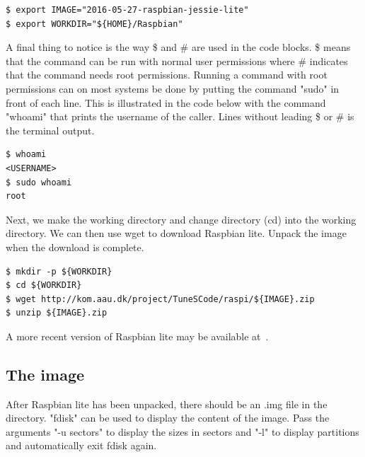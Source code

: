 
\begin{lstlisting}[]
$ export IMAGE="2016-05-27-raspbian-jessie-lite"
$ export WORKDIR="${HOME}/Raspbian"
\end{lstlisting}
\FloatBarrier
\vspace{-5mm}

A final thing to notice is the way \$ and \# are used in the code blocks. \$
means that the command can be run with normal user permissions where \# indicates that the
command needs root permissions.
Running a command with root permissions can on most systems be done by putting
the command "sudo" in front of each line. This is illustrated in the code below
with the command "whoami" that prints the username of the caller. Lines without
leading \$ or \# is the terminal output.

\begin{lstlisting}[]
$ whoami
<USERNAME>
$ sudo whoami
root
\end{lstlisting}
\FloatBarrier
\vspace{-5mm}

Next, we make the working directory and change directory (cd) into the working
directory. We can then use wget to download Raspbian lite. Unpack the image
when the download is complete.

\begin{lstlisting}[]
$ mkdir -p ${WORKDIR}
$ cd ${WORKDIR}
$ wget http://kom.aau.dk/project/TuneSCode/raspi/${IMAGE}.zip
$ unzip ${IMAGE}.zip
\end{lstlisting}
\FloatBarrier
\vspace{-5mm}

A more recent version of Raspbian lite may be available at~\cite{raspbian}.

\subsection{The image}

After Raspbian lite has been unpacked, there should be an .img file in the directory.
"fdisk" can be used to display the content of the image. Pass the arguments "-u sectors" to
display the sizes in sectors and "-l" to display partitions and automatically
exit fdisk again.

